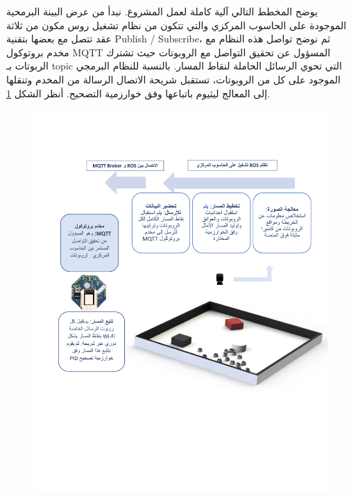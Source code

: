 يوضح المخطط التالي آلية كاملة لعمل المشروع. نبدأ من عرض البينة البرمحية الموجودة على الحاسوب المركزي والتي تتكون من نظام تشغيل روس مكون من ثلاثة عقد تتصل مع بعضها بتقنية \textenglish{Publish / Subscribe}، ثم نوضح تواصل هذه النظام مع مخدم بروتوكول MQTT المسؤول عن تحقيق التواصل مع الروبوتات حيث تشترك الربوتات بـ topic التي تحوي الرسائل الحاملة لنقاط المسار. بالنسبة للنظام البرمجي الموجود على كل من الروبوتات، تستقبل شريحة الاتصال الرسالة من المخدم وتنقلها إلى المعالج ليثيوم باتباعها وفق خوارزمية التصحيح. أنظر الشكل \ref{fig:08-graph}.


\begin{figure}
	\centering
	\includegraphics[width=0.95\linewidth]{08-graph}
	\caption{}
	\label{fig:08-graph}
\end{figure}
